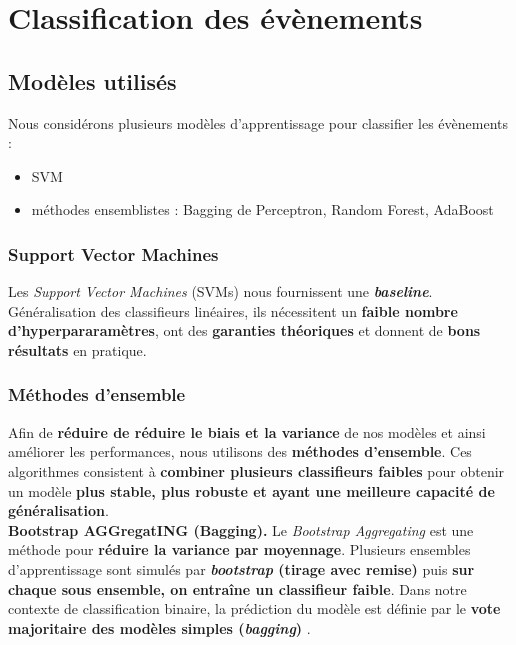 \documentclass[12pt]{article}
\begin{document}
\section{Classification des évènements}

\subsection{Modèles utilisés}

Nous considérons plusieurs modèles d'apprentissage pour classifier les
évènements :

\begin{itemize}
    \item SVM
    \item méthodes ensemblistes : Bagging de Perceptron, Random Forest, AdaBoost
\end{itemize}

\subsubsection{Support Vector Machines}

Les \emph{Support Vector Machines} (SVMs) nous fournissent une
\textbf{\emph{baseline}}. Généralisation des classifieurs linéaires, ils
nécessitent un \textbf{faible nombre d'hyperpararamètres}, ont des
\textbf{garanties théoriques} et donnent de \textbf{bons résultats} en pratique.

\subsubsection{Méthodes d'ensemble}

Afin de \textbf{réduire de réduire le biais et la variance} de nos modèles et
ainsi améliorer les performances, nous utilisons des \textbf{méthodes
d'ensemble}. Ces algorithmes consistent à \textbf{combiner plusieurs classifieurs
faibles} pour obtenir un modèle \textbf{plus stable, plus robuste et ayant une meilleure
capacité de généralisation}. \\

\textbf{Bootstrap AGGregatING (Bagging). } \quad Le \emph{Bootstrap
Aggregating} est une méthode pour \textbf{réduire la variance par moyennage}.
Plusieurs ensembles d'apprentissage sont simulés par \textbf{\emph{bootstrap} (tirage
avec remise)} puis \textbf{sur chaque sous ensemble, on entraîne un classifieur faible}.
Dans notre contexte de classification binaire, la prédiction du modèle
est définie par le \textbf{vote majoritaire des modèles simples (\emph{bagging})} .
\end{document}
